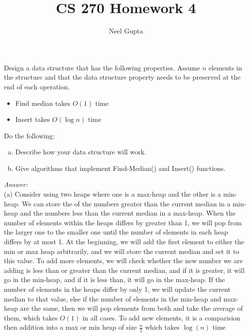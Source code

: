 \documentclass[12pt]{article}
\newenvironment{problem}[2][Problem]{\begin{trivlist}
\item[\hskip \labelsep {\bfseries #1}\hskip \labelsep {\bfseries #2.}]}{\end{trivlist}}
\begin{document}

\title{\vspace{-4cm}CS 270 Homework 4}
\author{Neel Gupta} 
\maketitle

\begin{problem}{1}
    Design a data structure that has the following properties. Assume $n$ elements in the structure and that the data structure property needs to be preserved at the end of each operation.
    \begin{itemize}
        \item Find median takes $O(1)$ time
        \item Insert takes $O(\log n)$ time
    \end{itemize}
    Do the following:
    \begin{enumerate}[(a)]
        \item Describe how your data structure will work.
        \item Give algorithms that implement Find-Median() and Insert() functions.
    \end{enumerate}
\end{problem}
\textit{Answer:} \\
(a) Consider using two heaps where one is a max-heap and the other is a min-heap. We can store the of the numbers greater than the current median in a min-heap and the numbers less than the current median in a max-heap. When the number of elements within the heaps differs by greater than 1, we will pop from the larger one to the smaller one until the number of elements in each heap differs by at most 1. At the beginning, we will add the first element to either the min or max heap arbitrarily, and we will store the current median and set it to this value. To add more elements, we will check whether the new number we are adding is less than or greater than the current median, and if it is greater, it will go in the min-heap, and if it is less than, it will go in the max-heap. If the number of elements in the heaps differ by only 1, we will update the current median to that value, else if the number of elements in the min-heap and max-heap are the same, then we will pop elements from both and take the average of them, which takes $O(1)$ in all cases. To add new elements, it is a comparision then addition into a max or min heap of size $\frac{n}{2}$ which takes $\log(n)$ time\\
\end{document}
